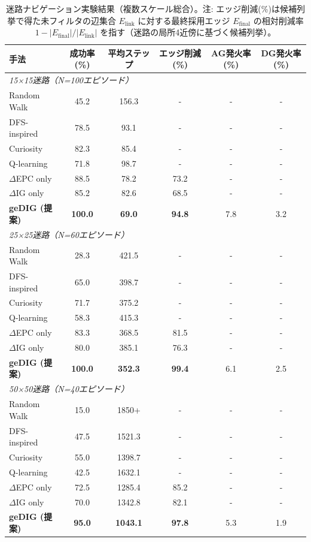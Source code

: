 \documentclass[ja=standard,xelatex]{bxjsarticle}
\begin{document}
\begin{table}[H]
\centering
\caption{迷路ナビゲーション実験結果（複数スケール総合）。注: エッジ削減(\%)は候補列挙で得た未フィルタの辺集合 $E_{\mathrm{link}}$ に対する最終採用エッジ $E_{\mathrm{final}}$ の相対削減率 $1-\lvert E_{\mathrm{final}}\rvert/\lvert E_{\mathrm{link}}\rvert$ を指す（迷路の局所4近傍に基づく候補列挙）。}
\label{tab:maze_results}
\begin{tabular}{lccccc}
\toprule
手法 & 成功率(\%) & 平均ステップ & エッジ削減(\%) & AG発火率(\%) & DG発火率(\%) \\
\midrule
\multicolumn{6}{l}{\textit{15×15迷路（N=100エピソード）}} \\
Random Walk & 45.2 & 156.3 & - & - & - \\
DFS-inspired & 78.5 & 93.1 & - & - & - \\
Curiosity & 82.3 & 85.4 & - & - & - \\
Q-learning & 71.8 & 98.7 & - & - & - \\
$\Delta$EPC only & 88.5 & 78.2 & 73.2 & - & - \\
$\Delta$IG only & 85.2 & 82.6 & 68.5 & - & - \\
\textbf{geDIG (提案)} & \textbf{100.0} & \textbf{69.0} & \textbf{94.8} & 7.8 & 3.2 \\
\midrule
\multicolumn{6}{l}{\textit{25×25迷路（N=60エピソード）}} \\
Random Walk & 28.3 & 421.5 & - & - & - \\
DFS-inspired & 65.0 & 398.7 & - & - & - \\
Curiosity & 71.7 & 375.2 & - & - & - \\
Q-learning & 58.3 & 415.3 & - & - & - \\
$\Delta$EPC only & 83.3 & 368.5 & 81.5 & - & - \\
$\Delta$IG only & 80.0 & 385.1 & 76.3 & - & - \\
\textbf{geDIG (提案)} & \textbf{100.0} & \textbf{352.3} & \textbf{99.4} & 6.1 & 2.5 \\
\midrule
\multicolumn{6}{l}{\textit{50×50迷路（N=40エピソード）}} \\
Random Walk & 15.0 & 1850+ & - & - & - \\
DFS-inspired & 47.5 & 1521.3 & - & - & - \\
Curiosity & 55.0 & 1398.7 & - & - & - \\
Q-learning & 42.5 & 1632.1 & - & - & - \\
$\Delta$EPC only & 72.5 & 1285.4 & 85.2 & - & - \\
$\Delta$IG only & 70.0 & 1342.8 & 82.1 & - & - \\
\textbf{geDIG (提案)} & \textbf{95.0} & \textbf{1043.1} & \textbf{97.8} & 5.3 & 1.9 \\
\bottomrule
\end{tabular}
\end{table}
\end{document}
